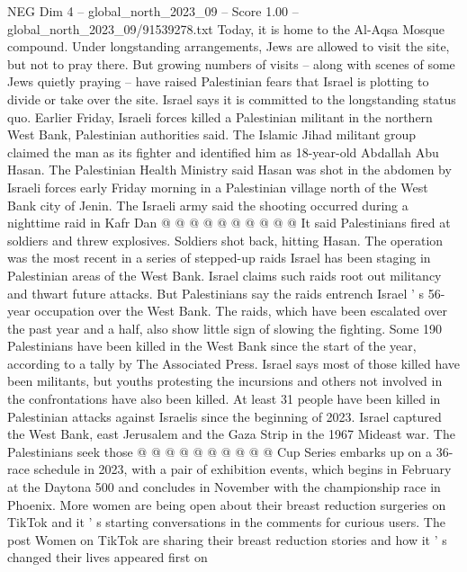 \begin{textsample}{NEG Dim 4 – global\_north\_2023\_09 – Score 1.00 – global\_north\_2023\_09/91539278.txt}
Today, it is home to the Al-Aqsa Mosque compound.
Under longstanding arrangements, Jews are allowed to visit the site, but not to pray there.
But growing numbers of visits -- along with scenes of some Jews quietly praying -- have raised Palestinian fears that Israel is plotting to divide or take over the site.
Israel says it is committed to the longstanding status quo.
Earlier Friday, Israeli forces killed a Palestinian militant in the northern West Bank, Palestinian authorities said.
The Islamic Jihad militant group claimed the man as its fighter and identified him as 18-year-old Abdallah Abu Hasan.
The Palestinian Health Ministry said Hasan was shot in the abdomen by Israeli forces early Friday morning in a Palestinian village north of the West Bank city of Jenin.
The Israeli army said the shooting occurred during a nighttime raid in Kafr Dan @ @ @ @ @ @ @ @ @ @ It said Palestinians fired at soldiers and threw explosives.
Soldiers shot back, hitting Hasan.
The operation was the most recent in a series of stepped-up raids Israel has been staging in Palestinian areas of the West Bank.
Israel claims such raids root out militancy and thwart future attacks.
But Palestinians say the raids entrench Israel ' s 56-year occupation over the West Bank.
The raids, which have been escalated over the past year and a half, also show little sign of slowing the fighting.
Some 190 Palestinians have been killed in the West Bank since the start of the year, according to a tally by The Associated Press.
Israel says most of those killed have been militants, but youths protesting the incursions and others not involved in the confrontations have also been killed.
At least 31 people have been killed in Palestinian attacks against Israelis since the beginning of 2023.
Israel captured the West Bank, east Jerusalem and the Gaza Strip in the 1967 Mideast war.
The Palestinians seek those @ @ @ @ @ @ @ @ @ @ Cup Series embarks up on a 36-race schedule in 2023, with a pair of exhibition events, which begins in February at the Daytona 500 and concludes in November with the championship race in Phoenix.
More women are being open about their breast reduction surgeries on TikTok and it ' s starting conversations in the comments for curious users.
The post Women on TikTok are sharing their breast reduction stories and how it ' s changed their lives appeared first on

\end{textsample}

